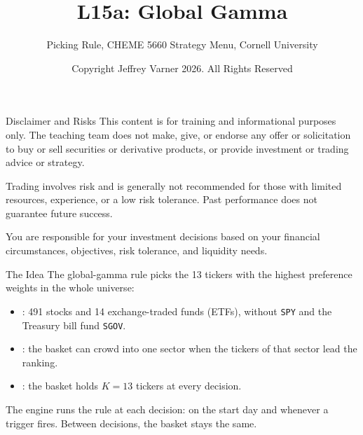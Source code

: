 \documentclass[aspectratio=169,11pt]{beamer}
\title{\texorpdfstring{{\vnheavy L15a}}{L15a}: Global Gamma}
\subtitle{Picking Rule, CHEME 5660 Strategy Menu, Cornell University}
\author{Copyright Jeffrey Varner 2026. All Rights Reserved}
\begin{document}
\vntitlepage

\begin{frame}{Disclaimer and Risks}
  \vspace{0.6em}
  \textbf{} This content is for training and informational
  purposes only. The teaching team does not make, give, or endorse any offer or
  solicitation to buy or sell securities or derivative products, or provide
  investment or trading advice or strategy.

  \vspace{1.1em}
  \textbf{} Trading involves risk and is generally not recommended for
  those with limited resources, experience, or a low risk tolerance. Past
  performance does not guarantee future success.

  \vspace{1.1em}
  \textbf{} You are responsible for your investment decisions
  based on your financial circumstances, objectives, risk tolerance, and
  liquidity needs.
\end{frame}

\begin{frame}{The Idea}
  \vspace{0.3em}
  The global-gamma rule picks the 13 tickers with the highest preference weights in the whole universe:
  \begin{itemize}\setlength{\itemsep}{0.5em}
    \item {}: 491 stocks and 14 exchange-traded funds (ETFs), without \texttt{SPY} and the Treasury bill fund \texttt{SGOV}.
    \item {}: the basket can crowd into one sector when the tickers of that sector lead the ranking.
    \item {}: the basket holds $K=13$ tickers at every decision.
  \end{itemize}

  \vspace{0.5em}
  The engine runs the rule at each decision: on the start day and whenever a trigger fires. Between decisions, the basket stays the same.
\end{frame}
\end{document}
